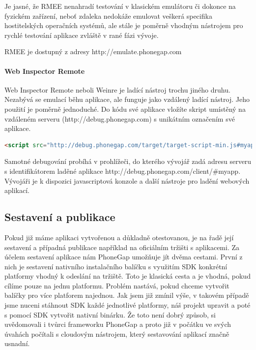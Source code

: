 Je jasné, že RMEE nenahradí testování v klasickém emulátoru či dokonce na fyzickém zařízení, neboť zdaleka nedokáže emulovat veškerá specifika hostitelských operačních systémů, ale stále je poměrně vhodným nástrojem pro rychlé testování aplikace zvláště v rané fázi vývoje.

RMEE je dostupný z adresy http://emulate.phonegap.com

\paragraph{Web Inspector Remote}
Web Inspector Remote neboli Weinre je ladící nástroj trochu jiného druhu. Nezabývá se emulací běhu aplikace, ale funguje jako vzdálený ladící nástroj. Jeho použití je poměrně jednoduché. Do kódu své aplikace vložíte skript umístěný na vzdáleném serveru (http://debug.phonegap.com) s unikátním označením své aplikace.

\begin{lstlisting}[language=HTML,breaklines=true]
<script src="http://debug.phonegap.com/target/target-script-min.js#myapp"></script>
\end{lstlisting}

Samotné debugování probíhá v prohlížeči, do kterého vývojář zadá adresu serveru s identifikátorem laděné aplikace http://debug.phonegap.com/client/\#myapp. Vývojáři je k dispozici javascriptová konzole a další nástroje pro ladění webových aplikací.

\subsection{Sestavení a publikace}
Pokud již máme aplikaci vytvořenou a důkladně otestovanou, je na řadě její sestavení a případná publikace například na oficiálním tržišti s aplikacemi. Za účelem sestavení aplikace nám PhoneGap umožňuje jít dvěma cestami. První z nich je sestavení nativního instalačního balíčku s využitím SDK konkrétní platformy vhodný k odeslání na tržiště. Toto je klasická cesta a je vhodná, pokud cílíme pouze na jednu platformu. Problém nastává, pokud chceme vytvořit balíčky pro více platforem najednou. Jak jsem již zmínil výše, v takovém případě jsme nuceni stáhnout SDK každé jednotlivé platformy, náš projekt upravit a poté s pomocí SDK vytvořit nativní binárku. Že toto není dobrý způsob, si uvědomovali i tvůrci frameworku PhoneGap a proto již v počátku ve svých úvahách počítali s cloudovým nástrojem, který sestavování aplikací značně usnadní.

